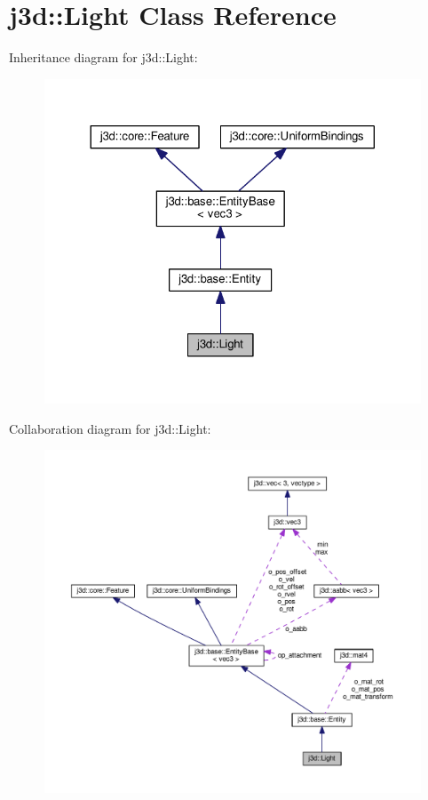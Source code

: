 \hypertarget{classj3d_1_1Light}{}\section{j3d\+:\+:Light Class Reference}
\label{classj3d_1_1Light}


Inheritance diagram for j3d\+:\+:Light\+:
\nopagebreak
\begin{figure}[H]
\begin{center}
\leavevmode
\includegraphics[width=324pt]{classj3d_1_1Light__inherit__graph}
\end{center}
\end{figure}


Collaboration diagram for j3d\+:\+:Light\+:
\nopagebreak
\begin{figure}[H]
\begin{center}
\leavevmode
\includegraphics[width=350pt]{classj3d_1_1Light__coll__graph}
\end{center}
\end{figure}
